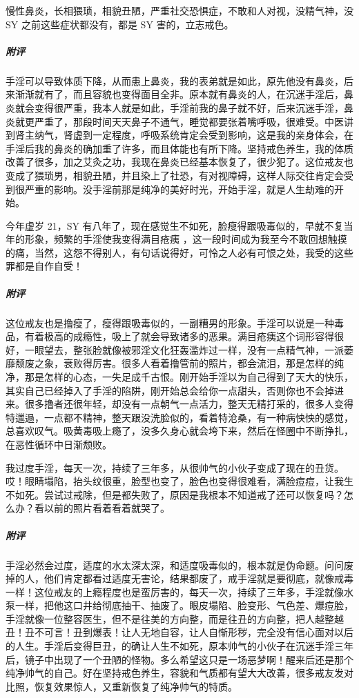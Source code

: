 \begin{case}[变丑]
    慢性鼻炎，长相猥琐，相貌丑陋，严重社交恐惧症，不敢和人对视，没精气神，没 SY 之前这些症状都没有，都是 SY 害的，立志戒色。
    \subparagraph{附评} 手淫可以导致体质下降，从而患上鼻炎，我的表弟就是如此，原先他没有鼻炎，后来渐渐就有了，而且容貌也变得面目全非。原本就有鼻炎的人，在沉迷手淫后，鼻炎就会变得很严重，我本人就是如此，手淫前我的鼻子就不好，后来沉迷手淫，鼻炎就更严重了，那段时间天天鼻子不通气，睡觉都要张着嘴呼吸，很难受。中医讲到肾主纳气，肾虚到一定程度，呼吸系统肯定会受到影响，这是我的亲身体会，在手淫后我的鼻炎的确加重了许多，而且体能也有所下降。坚持戒色养生，我的体质改善了很多，加之艾灸之功，我现在鼻炎已经基本恢复了，很少犯了。这位戒友也变成了猥琐男，相貌丑陋，并且染上了社恐，有对视障碍，这样人际交往肯定会受到很严重的影响。没手淫前那是纯净的美好时光，开始手淫，就是人生劫难的开始。
\end{case}

\begin{case}[变丑]
    今年虚岁 21，SY 有八年了，现在感觉生不如死，脸瘦得跟吸毒似的，早就不复当年的形象，频繁的手淫使我变得满目疮痍 ，这一段时间成为我至今不敢回想触摸的痛，当然，这怨不得别人，有句话说得好，可怜之人必有可恨之处，我受的这些罪都是自作自受！
    \subparagraph{附评} 这位戒友也是撸瘦了，瘦得跟吸毒似的，一副糟男的形象。手淫可以说是一种毒品，有着极高的成瘾性，吸上了就会导致诸多的恶果。满目疮痍这个词形容得很好，一眼望去，整张脸就像被邪淫文化狂轰滥炸过一样，没有一点精气神，一派萎靡颓废之象，衰败得厉害。很多人看着撸管前的照片，都会流泪，那是怎样的纯净，那是怎样的心态，一失足成千古恨。刚开始手淫以为自己得到了天大的快乐，其实自己已经掉入了手淫的陷阱，刚开始总会给你一点甜头，否则你也不会掉进来。很多撸者还很年轻，却没有一点朝气一点活力，整天无精打采的，很多人变得特邋遢，一点都不精神，整天跟没洗脸似的，看着特沧桑，有一种病怏怏的感觉，总喜欢叹气。吸黄毒吸上瘾了，没多久身心就会垮下来，然后在怪圈中不断挣扎，在恶性循环中日渐颓败。
\end{case}

\begin{case}[变丑]
    我过度手淫，每天一次，持续了三年多，从很帅气的小伙子变成了现在的丑货。哎！眼睛塌陷，抬头纹很重，脸型也变了，脸色也变得很难看，满脸痘痘，让我生不如死。尝试过戒除，但是都失败了，原因是我根本不知道戒了还可以恢复吗？怎么办？看以前的照片看着看着就哭了。
    \subparagraph{附评} 手淫必然会过度，适度的水太深太深，和适度吸毒似的，根本就是伪命题。问问废掉的人，他们肯定都看过适度无害论，结果都废了，戒手淫就是要彻底，就像戒毒一样！这位戒友的上瘾程度也是蛮厉害的，每天一次，持续了三年多，手淫就像水泵一样，把他这口井给彻底抽干、抽废了。眼皮塌陷、脸变形、气色差、爆痘脸，手淫就像一位整容医生，但不是往美的方向整，而是往丑的方向整，把人越整越丑！丑不可言！丑到爆表！让人无地自容，让人自惭形秽，完全没有信心面对以后的人生。手淫后变得巨丑，的确让人生不如死，原本帅气的小伙子在沉迷手淫三年后，镜子中出现了一个丑陋的怪物。多么希望这只是一场恶梦啊！醒来后还是那个纯净帅气的自己。好在坚持戒色养生，容貌和气质都有望大大改善，很多戒友发对比照，恢复效果惊人，又重新恢复了纯净帅气的特质。
\end{case}

